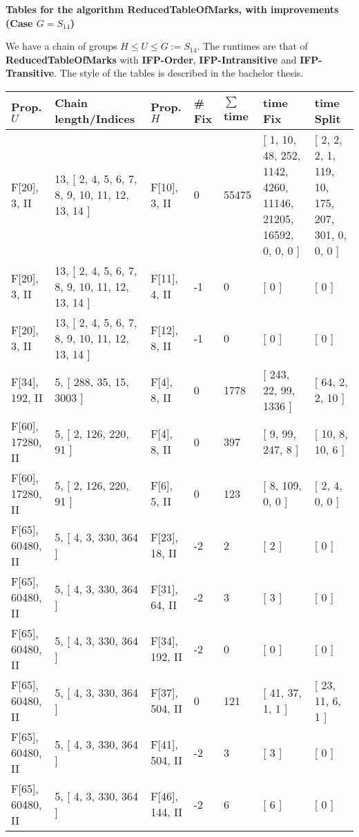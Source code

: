 \documentclass[9 pt]{scrartcl}
\begin{document}
\begin{center}

\textbf{\LARGE Tables for the algorithm ReducedTableOfMarks, with improvements (Case $G=S_{14}$)} 

\end{center}
We have a chain of groups $H \leq U \leq G:=S_{14}$. The runtimes are that of \textbf{ReducedTableOfMarks} with \textbf{IFP-Order}, \textbf{IFP-Intransitive} and \textbf{IFP-Transitive}. The style of the tables is described in the bachelor thesis.
\begin{longtable}{ |p{3em}|p{6em}|p{3em}|p{2em}|p{2em}|p{6em}|p{6em}| }\hline 
    Prop. $U$ & Chain length/Indices & Prop. $H$ & \# Fix & $\sum$ time & time Fix& time Split   \\ \hline
F[20], 3, II &13, [ 2, 4, 5, 6, 7, 8, 9, 10, 11, 12, 13, 14 ] & F[10], 3, II  & 0 & 55475 & [ 1, 10, 48, 252, 1142, 4260, 11146, 21205, 16592, 0, 0, 0 ] & [ 2, 2, 2, 1, 119, 10, 175, 207, 301, 0, 0, 0 ]\\ \hline
F[20], 3, II &13, [ 2, 4, 5, 6, 7, 8, 9, 10, 11, 12, 13, 14 ] & F[11], 4, II  & -1 & 0 & [ 0 ] & [ 0 ]\\ \hline
F[20], 3, II &13, [ 2, 4, 5, 6, 7, 8, 9, 10, 11, 12, 13, 14 ] & F[12], 8, II  & -1 & 0 & [ 0 ] & [ 0 ]\\ \hline
F[34], 192, II &5, [ 288, 35, 15, 3003 ] & F[4], 8, II  & 0 & 1778 & [ 243, 22, 99, 1336 ] & [ 64, 2, 2, 10 ]\\ \hline
F[60], 17280, II &5, [ 2, 126, 220, 91 ] & F[4], 8, II  & 0 & 397 & [ 9, 99, 247, 8 ] & [ 10, 8, 10, 6 ]\\ \hline
F[60], 17280, II &5, [ 2, 126, 220, 91 ] & F[6], 5, II  & 0 & 123 & [ 8, 109, 0, 0 ] & [ 2, 4, 0, 0 ]\\ \hline
F[65], 60480, II &5, [ 4, 3, 330, 364 ] & F[23], 18, II  & -2 & 2 & [ 2 ] & [ 0 ]\\ \hline
F[65], 60480, II &5, [ 4, 3, 330, 364 ] & F[31], 64, II  & -2 & 3 & [ 3 ] & [ 0 ]\\ \hline
F[65], 60480, II &5, [ 4, 3, 330, 364 ] & F[34], 192, II  & -2 & 0 & [ 0 ] & [ 0 ]\\ \hline
F[65], 60480, II &5, [ 4, 3, 330, 364 ] & F[37], 504, II  & 0 & 121 & [ 41, 37, 1, 1 ] & [ 23, 11, 6, 1 ]\\ \hline
F[65], 60480, II &5, [ 4, 3, 330, 364 ] & F[41], 504, II  & -2 & 3 & [ 3 ] & [ 0 ]\\ \hline
F[65], 60480, II &5, [ 4, 3, 330, 364 ] & F[46], 144, II  & -2 & 6 & [ 6 ] & [ 0 ]\\ \hline

\end{longtable}
\end{document}
